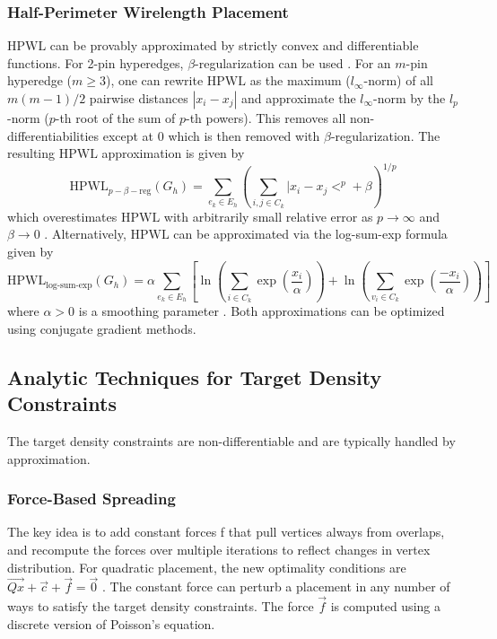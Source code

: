 \documentclass[natbib]{svcyclop}
\begin{document}
\subsubsection{Half-Perimeter Wirelength Placement} $\mathrm{HPWL}$ can be
provably approximated by strictly convex and differentiable
functions. For 2-pin hyperedges, $\beta$-regularization
can be used \cite{AlpChKaMaMu98}. For an $m$-pin hyperedge ($m \ge 3$), one
can rewrite $\mathrm{HPWL}$ as the maximum ($l_\infty$-norm) of all
$m(m-1)/2$ pairwise distances $|x_i - x_j|$ and approximate
the $l_\infty$-norm by the $l_p$-norm ($p$-th root of the sum of $p$-th
powers). This removes all non-differentiabilities except
at $0$ which is then removed with $\beta$-regularization. The resulting
$\mathrm{HPWL}$ approximation is given by
\begin{equation}\label{eq:second}
\mathrm{HPWL}_{p-\beta-\mathrm{reg}}(G_h)=\sum_{e_k\in E_h}\left(\sum_{i,j\in C_k}|x_i-x_j<^p+\beta\right)^{1/p}
\end{equation}
which overestimates $\mathrm{HPWL}$ with arbitrarily small relative
error as $p\to \infty$ and $\beta\to0$ \cite{RedCho06}. Alternatively, $\mathrm{HPWL}$ can
be approximated via the log-sum-exp formula given by
\begin{equation}\label{eq:third}
\mathrm{HPWL}_{\text{log-sum-exp}}(G_h)=
\alpha\sum_{e_k\in E_h}\left[\ln\left(\sum_{i\in C_k}\exp
\left(\frac{x_i}{\alpha}\right)\right)+\ln\left(\sum_{v_i\in C_k}
\exp\left(\frac{-x_i}{\alpha}\right)\right)\right]
\end{equation}
where $\alpha > 0$ is a smoothing parameter \cite{KhaWan05}. Both approximations
can be optimized using conjugate gradient methods.

\subsection{Analytic Techniques for Target Density Constraints}
The target density constraints are non-differentiable and
are typically handled by approximation.

\subsubsection{Force-Based Spreading} The key idea is to add constant
forces f that pull vertices always from overlaps, and recompute
the forces over multiple iterations to reflect changes
in vertex distribution. For quadratic placement, the new
optimality conditions are $\vec{Qx} + \vec{c} + \vec{f} = \vec{0}$ \cite{KenVor06}. The constant
force can perturb a placement in any number of ways to
satisfy the target density constraints. The force $\vec{f}$ is computed
using a discrete version of Poisson's equation.
\end{document}
